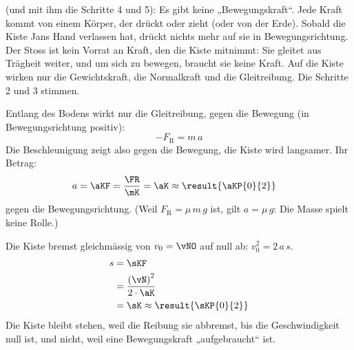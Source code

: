 \begin{abcliste}
\abc
{} (und mit ihm die Schritte 4 und 5): Es gibt keine „Bewegungskraft“. Jede Kraft kommt von einem Körper, der drückt oder zieht (oder von der Erde). Sobald die Kiste Jans Hand verlassen hat, drückt nichts mehr auf sie in Bewegungsrichtung. Der Stoss ist kein Vorrat an Kraft, den die Kiste mitnimmt: Sie gleitet aus Trägheit weiter, und um sich zu bewegen, braucht sie keine Kraft. Auf die Kiste wirken nur die Gewichtskraft, die Normalkraft und die Gleitreibung. Die Schritte 2 und 3 stimmen.

\abc
Entlang des Bodens wirkt nur die Gleitreibung, gegen die Bewegung (in Bewegungsrichtung positiv):
\[
 -F_\mathrm{R} = m\,a
\]
Die Beschleunigung zeigt also gegen die Bewegung, die Kiste wird langsamer. Ihr Betrag:
\begin{align}
 a &= \aKF = \frac{\FR}{\mK} = \aK \approx \result{\aKP{0}{2}}
\end{align}
gegen die Bewegungsrichtung. (Weil $F_\mathrm{R} = \mu\,m\,g$ ist, gilt $a = \mu\,g$: Die Masse spielt keine Rolle.)

\abc
Die Kiste bremst gleichmässig von $v_0 = \vNO$ auf null ab: $v_0^2 = 2\,a\,s$.
\begin{align}
 s &= \sKF \\
   &= \frac{\left(\vN\right)^2}{2\cdot\aK} \\
   &= \sK \approx \result{\sKP{0}{2}}
\end{align}
Die Kiste bleibt stehen, weil die Reibung sie abbremst, bis die Geschwindigkeit null ist, und nicht, weil eine Bewegungskraft „aufgebraucht“ ist.
\end{abcliste}
